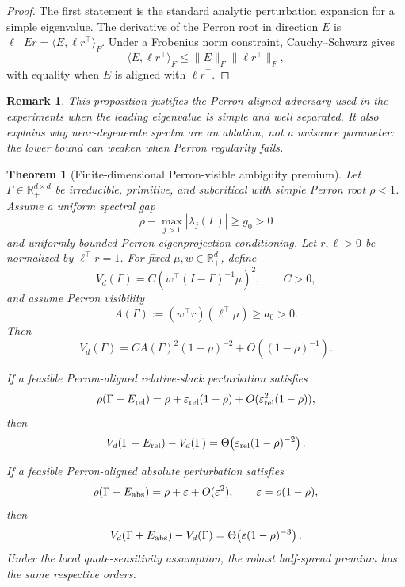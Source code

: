 \documentclass[11pt]{article}
\newtheorem{theorem}{Theorem}
\newtheorem{remark}{Remark}
\newcommand{\R}{\mathbb{R}}
\newcommand{\eps}{\varepsilon}
\begin{document}
\begin{proof}
The first statement is the standard analytic perturbation expansion for a
simple eigenvalue. The derivative of the Perron root in direction $E$ is
$\ell^\top E r=\langle E,\ell r^\top\rangle_F$. Under a Frobenius norm
constraint, Cauchy--Schwarz gives
\[
\langle E,\ell r^\top\rangle_F
\le \|E\|_F\|\ell r^\top\|_F,
\]
with equality when $E$ is aligned with $\ell r^\top$.
\end{proof}

\begin{remark}
This proposition justifies the Perron-aligned adversary used in the experiments
when the leading eigenvalue is simple and well separated. It also explains why
near-degenerate spectra are an ablation, not a nuisance parameter: the lower
bound can weaken when Perron regularity fails.
\end{remark}

\begin{theorem}[Finite-dimensional Perron-visible ambiguity premium]
Let $\Gamma\in\R_+^{d\times d}$ be irreducible, primitive, and subcritical
with simple Perron root $\rho<1$. Assume a uniform spectral gap
\[
\rho-\max_{j>1}|\lambda_j(\Gamma)|\ge g_0>0
\]
and uniformly bounded Perron eigenprojection conditioning. Let $r,\ell>0$ be
normalized by $\ell^\top r=1$. For fixed $\mu,w\in\R_+^d$, define
\[
V_d(\Gamma)=C\left(w^\top(I-\Gamma)^{-1}\mu\right)^2,
\qquad C>0,
\]
and assume Perron visibility
\[
A(\Gamma):=(w^\top r)(\ell^\top\mu)\ge a_0>0.
\]
Then
\[
V_d(\Gamma)=C A(\Gamma)^2(1-\rho)^{-2}+O((1-\rho)^{-1}).
\]

If a feasible Perron-aligned relative-slack perturbation satisfies
\[
\rho(\Gamma+E_{\rm rel})
=\rho+\eps_{\rm rel}(1-\rho)+O(\eps_{\rm rel}^2(1-\rho)),
\]
then
\[
V_d(\Gamma+E_{\rm rel})-V_d(\Gamma)
=\Theta\!\left(\eps_{\rm rel}(1-\rho)^{-2}\right).
\]

If a feasible Perron-aligned absolute perturbation satisfies
\[
\rho(\Gamma+E_{\rm abs})=\rho+\eps+O(\eps^2),
\qquad \eps=o(1-\rho),
\]
then
\[
V_d(\Gamma+E_{\rm abs})-V_d(\Gamma)
=\Theta\!\left(\eps(1-\rho)^{-3}\right).
\]
Under the local quote-sensitivity assumption, the robust half-spread premium
has the same respective orders.
\end{theorem}
\end{document}
